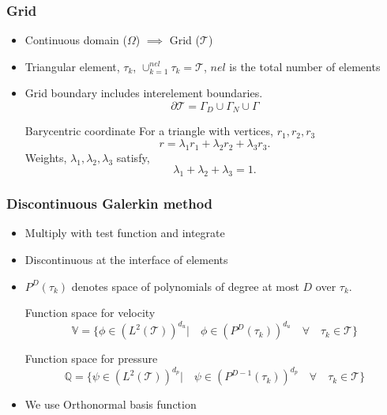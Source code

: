 \documentclass{beamer}
\begin{document}
\begin{frame}
\frametitle{Grid}
\begin{itemize}
\item Continuous domain ($\Omega$) $\implies$ Grid ($\mathcal{T}$)
\item Triangular element, $\tau_k$, $\cup_{k=1}^{nel} \tau_k = \mathcal{T}$, $nel$ is the total number of elements
\item Grid boundary includes interelement boundaries.
\begin{equation}
\partial \mathcal{T} = \Gamma_D \cup \Gamma_N \cup \Gamma
\end{equation}

\begin{block}{Barycentric coordinate}
For a triangle with vertices, $r_1, r_2, r_3$
\begin{equation}\label{barycentric point}
r = \lambda_1 r_1 + \lambda_2 r_2 + \lambda_3 r_3 \textrm{.}
\end{equation}
Weights, $\lambda_1, \lambda_2, \lambda_3$ satisfy,
\begin{equation}\label{lambda constraint} 
\lambda_1 + \lambda_2 + \lambda_3 = 1 \textrm{.}
\end{equation}
\end{block}

\end{itemize}
\end{frame}


\begin{frame}
\frametitle{Discontinuous Galerkin method}
\begin{itemize}
\item Multiply with test function and integrate
\item Discontinuous at the interface of elements
\item $P^D(\tau_k)$ denotes space of polynomials of degree at most $D$ over $\tau_k$.

\begin{block}{Function space for velocity}
\begin{equation}
\mathbb{V} = \lbrace \phi \in (L^2(\mathcal{T}))^{d_u}| \quad \phi \in (P^D(\tau_k))^{d_u} \quad \forall \quad {\tau_k} \in \mathcal{T} \rbrace
\end{equation}
\end{block}

\begin{block}{Function space for pressure}
\begin{equation}
\mathbb{Q} = \lbrace \psi \in (L^2(\mathcal{T}))^{d_p}| \quad \psi \in (P^{D-1}(\tau_k))^{d_p} \quad \forall \quad {\tau_k} \in \mathcal{T} \rbrace
\end{equation}
\end{block}
\item We use Orthonormal basis function
\end{itemize}
\end{frame}
\end{document}
